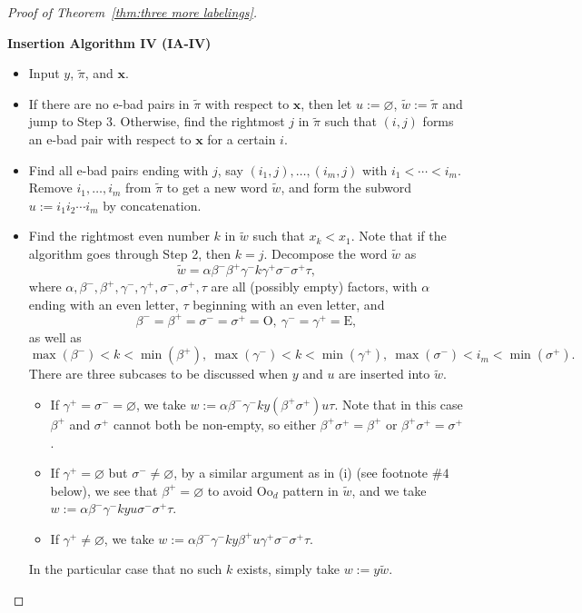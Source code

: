 \documentclass[11pt,reqno]{amsart}
\numberwithin{equation}{section}
\theoremstyle{plain}
\theoremstyle{definition}
\newcommand{\bx}{\mathbf{x}}
\def\Oo{\mathrm{Oo}}
\begin{document}
\begin{proof}[Proof of Theorem~\ref{thm:three more labelings}]
    \begin{framed}
    	\begin{center}
    		{\bf Insertion Algorithm IV (IA-IV)}
    	\end{center}
    	\begin{itemize}
    		\item[Initiate] Input $y$, $\tilde{\pi}$, and $\bx$.
    		\item[Step 1] If there are no e-bad pairs in $\tilde{\pi}$ with respect to $\bx$, then let $u:=\varnothing$, $\tilde{w}:=\tilde{\pi}$ and jump to Step 3. Otherwise, find the rightmost $j$ in $\tilde{\pi}$ such that $(i,j)$ forms an e-bad pair with respect to $\bx$ for a certain $i$.
    		\item[Step 2] Find all e-bad pairs ending with $j$, say $(i_1,j),\ldots,(i_m,j)$ with $i_1<\cdots<i_m$. Remove $i_1,\ldots,i_m$ from $\tilde{\pi}$ to get a new word $\tilde{w}$, and form the subword $u:=i_1 i_2 \cdots i_m$ by concatenation.
    		\item[Step 3] Find the rightmost even number $k$ in $\tilde{w}$ such that $x_k<x_1$. Note that if the algorithm goes through Step 2, then $k=j$. Decompose the word $\tilde{w}$ as 
    			$$\tilde{w}=\alpha \beta^{-}\beta^{+}\gamma^{-}k\gamma^{+}\sigma^{-}\sigma^{+}\tau,$$
    		where $\alpha,\beta^{-},\beta^{+},\gamma^{-},\gamma^{+},\sigma^{-},\sigma^{+},\tau$ are all (possibly empty) factors, with $\alpha$ ending with an even letter, $\tau$ beginning with an even letter, and 
    		$$\beta^{-}=\beta^{+}=\sigma^{-}=\sigma^{+}=\mathrm{O},~\gamma^{-}=\gamma^{+}=\mathrm{E},$$
    		as well as
    		$$\max(\beta^{-})<k<\min(\beta^{+}),~\max(\gamma^{-})<k<\min(\gamma^{+}),~\max(\sigma^{-})<i_m<\min(\sigma^{+}).$$
    		There are three subcases to be discussed when $y$ and $u$ are inserted into $\tilde{w}$.
    		\begin{itemize}
    			\item[(i)] If $\gamma^{+}=\sigma^{-}=\varnothing$, we take $w:=\alpha \beta^{-}\gamma^{-}ky (\beta^{+}\sigma^{+}) u\tau$. Note that in this case $\beta^{+}$ and $\sigma^{+}$ cannot both be non-empty\footnotemark, so either $\beta^+\sigma^+=\beta^+$ or $\beta^+\sigma^+=\sigma^+$.
    			\item[(ii)] If $\gamma^{+}=\varnothing$ but $\sigma^{-}\neq\varnothing$, by a similar argument as in (i) (see footnote $\# 4$ below), we see that $\beta^{+}=\varnothing$ to avoid $\Oo_d$ pattern in $\tilde{w}$, and we take $w:=\alpha\beta^{-}\gamma^{-}kyu\sigma^{-}\sigma^{+}\tau$.
    			\item[(iii)] If $\gamma^{+}\neq \varnothing$, we take $w:=\alpha\beta^{-}\gamma^{-}ky\beta^{+}u\gamma^{+}\sigma^{-}\sigma^{+}\tau$.
    		\end{itemize}
    		In the particular case that no such $k$ exists, simply take $w:=y\tilde{w}$.
    		

\end{itemize}
\end{framed}
\end{proof}
\end{document}
